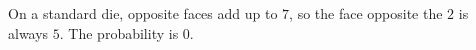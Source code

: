 On a standard die, opposite faces add up to $7$, so the face opposite the $2$ is always $5$. The probability is $\boxed{0}$.

